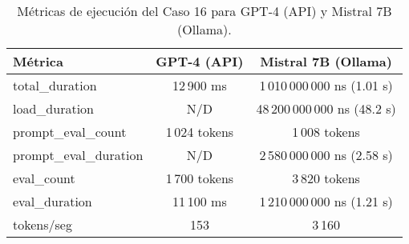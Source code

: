 
\begin{table}[h!]
\centering
\begin{tabular}{|l|c|c|}
\hline
\textbf{Métrica} & \textbf{GPT-4 (API)} & \textbf{Mistral 7B (Ollama)} \\
\hline
total\_duration & 12\,900 ms & 1\,010\,000\,000 ns (1.01 s) \\
load\_duration & N/D & 48\,200\,000\,000 ns (48.2 s) \\
prompt\_eval\_count & 1\,024 tokens & 1\,008 tokens \\
prompt\_eval\_duration & N/D & 2\,580\,000\,000 ns (2.58 s) \\
eval\_count & 1\,700 tokens & 3\,820 tokens \\
eval\_duration & 11\,100 ms & 1\,210\,000\,000 ns (1.21 s) \\
tokens/seg & 153 & 3\,160 \\
\hline
\end{tabular}
\caption{Métricas de ejecución del Caso 16 para GPT-4 (API) y Mistral 7B (Ollama).}
\end{table}
